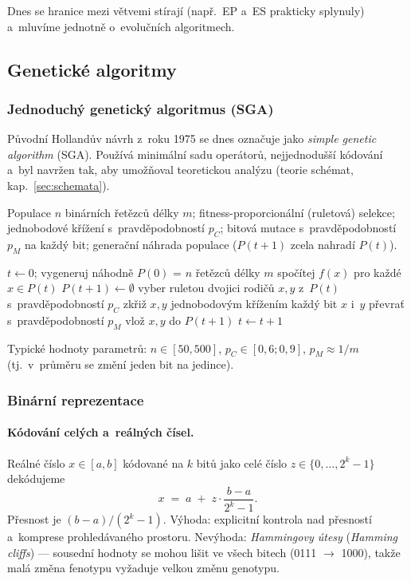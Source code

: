 \documentclass[11pt,a4paper]{article}
\theoremstyle{definition}
\begin{document}
Dnes se hranice mezi větvemi stírají (např.\ EP a~ES prakticky splynuly)
a~mluvíme jednotně o~evolučních algoritmech.

\subsection{Genetické algoritmy}
\label{ssec:sga}

\subsubsection{Jednoduchý genetický algoritmus (SGA)}

Původní Hollandův návrh z~roku 1975 se dnes označuje jako \emph{simple genetic
algorithm} (SGA). Používá minimální sadu operátorů, nejjednodušší kódování
a~byl navržen tak, aby umožňoval teoretickou analýzu (teorie schémat,
kap.~\ref{sec:schemata}).

\begin{defbox}[SGA]
Populace $n$ binárních řetězců délky $m$; fitness-proporcionální (ruletová)
selekce; jednobodové křížení s~pravděpodobností $p_C$; bitová mutace
s~pravděpodobností $p_M$ na každý bit; generační náhrada populace
($P(t+1)$ zcela nahradí $P(t)$).
\end{defbox}

\begin{algorithm}[!ht]
\caption{Jednoduchý genetický algoritmus (SGA)}
\begin{algorithmic}[1]
\State $t \gets 0$; vygeneruj náhodně $P(0)$ = $n$ řetězců délky $m$
  \State spočítej $f(x)$ pro každé $x \in P(t)$
  \State $P(t+1) \gets \emptyset$
    \State vyber ruletou dvojici rodičů $x, y$ z~$P(t)$
    \State s~pravděpodobností $p_C$ zkřiž $x, y$ jednobodovým křížením
    \State každý bit $x$ i~$y$ převrať s~pravděpodobností $p_M$
    \State vlož $x, y$ do $P(t+1)$
  \EndFor
  \State $t \gets t+1$
\EndWhile
\end{algorithmic}
\end{algorithm}

Typické hodnoty parametrů: $n \in [50, 500]$, $p_C \in [0{,}6; 0{,}9]$,
$p_M \approx 1/m$ (tj.\ v~průměru se změní jeden bit na jedince).

\subsubsection{Binární reprezentace}

\paragraph{Kódování celých a~reálných čísel.} Reálné číslo $x \in [a,b]$
kódované na $k$ bitů jako celé číslo $z \in \{0,\dots,2^k-1\}$ dekódujeme
\[
x \;=\; a \;+\; z \cdot \frac{b-a}{2^k - 1}.
\]
Přesnost je $(b-a)/(2^k-1)$. Výhoda: explicitní kontrola nad přesností
a~komprese prohledávaného prostoru. Nevýhoda: \emph{Hammingovy útesy}
(\emph{Hamming cliffs}) --- sousední hodnoty se mohou lišit ve všech bitech
(0111 $\to$ 1000), takže malá změna fenotypu vyžaduje velkou změnu genotypu.
\end{document}

